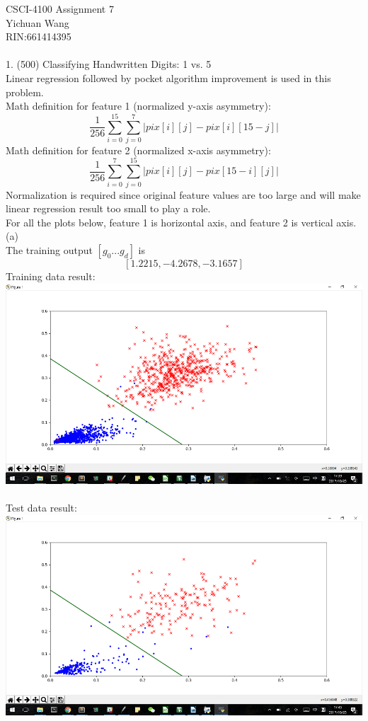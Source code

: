 \documentclass[12pt]{article}
\begin{document}
CSCI-4100 Assignment 7\\
Yichuan Wang \\
RIN:661414395\\\\
1. (500) Classifying Handwritten Digits: 1 vs. 5\\
Linear regression followed by pocket algorithm improvement is used in this problem.\\
Math definition for feature 1 (normalized y-axis asymmetry):\\
$$\frac{1}{256}\sum_{i=0}^{15}\sum_{j=0}^7|pix[i][j]-pix[i][15-j]|$$
Math definition for feature 2 (normalized x-axis asymmetry):\\
$$\frac{1}{256}\sum_{i=0}^7\sum_{j=0}^{15}|pix[i][j]-pix[15-i][j]|$$
Normalization is required since original feature values are too large and will make linear regression result too small to play a role.\\
For all the plots below, feature 1 is horizontal axis, and feature 2 is vertical axis.\\
(a) \\%
The training output $[g_0...g_d]$ is $$[1.2215, -4.2678, -3.1657]$$
Training data result:\\
\includegraphics[scale=0.6]{image/linear_train}\\\\
Test data result:\\
\includegraphics[scale=0.6]{image/linear_test}\\\\
\end{document}
